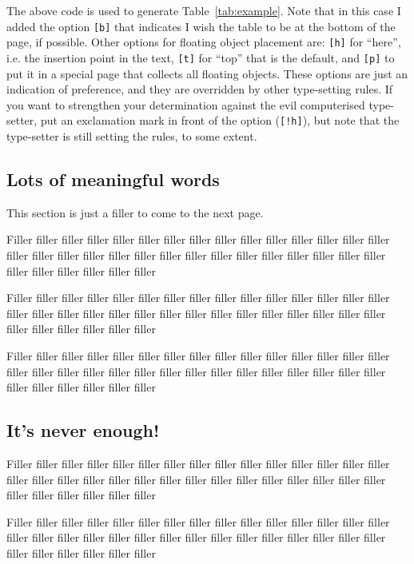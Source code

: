 \documentclass{fonetik}
\begin{document}
The above code is used to generate Table~\ref{tab:example}. Note that in this
case I added the option {\tt [b]} that indicates I wish the table to
be at the bottom of the page, if possible. Other options for floating
object placement are: {\tt [h]} for ``here'', i.e. the insertion point
in the text, {\tt [t]} for ``top'' that is the default, and {\tt [p]}
to put it in a special page that collects all floating objects. These
options are just an indication of preference, and they are overridden
by other type-setting rules. If you want to strengthen your
determination against the evil computerised type-setter, put an
exclamation mark in front of the option (\verb|[!h]|), but note that
the type-setter is still setting the rules, to some extent.

\subsection{Lots of meaningful words}
This section is just a filler to come to the next page.

Filler filler filler filler filler filler filler filler filler
filler filler filler filler filler filler filler filler filler
filler filler filler filler filler filler filler filler filler
filler filler filler filler filler filler filler filler filler

Filler filler filler filler filler filler filler filler filler
filler filler filler filler filler filler filler filler filler
filler filler filler filler filler filler filler filler filler
filler filler filler filler filler filler filler filler filler

Filler filler filler filler filler filler filler filler filler
filler filler filler filler filler filler filler filler filler
filler filler filler filler filler filler filler filler filler
filler filler filler filler filler filler filler filler filler

\subsection{It's never enough!}
Filler filler filler filler filler filler filler filler filler
filler filler filler filler filler filler filler filler filler
filler filler filler filler filler filler filler filler filler
filler filler filler filler filler filler filler filler filler

Filler filler filler filler filler filler filler filler filler
filler filler filler filler filler filler filler filler filler
filler filler filler filler filler filler filler filler filler
filler filler filler filler filler filler filler filler filler
\end{document}
